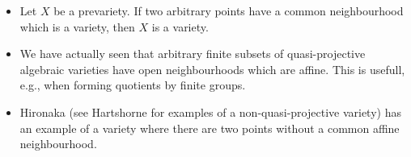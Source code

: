 \documentclass[a4paper,parskip=half,numbers=enddot, DIV=12]{scrreprt}
\begin{document}
    \begin{rem*}
        \begin{itemize}
          \item 
            Let $X$ be a prevariety. If two arbitrary points have a common neighbourhood which is a variety, then $X$ is a variety.
          \item 
            We have actually seen that arbitrary finite subsets of quasi-projective algebraic varieties have open neighbourhoods which are affine. This is usefull, e.g., when forming quotients by finite groups.
          \item
            Hironaka (see Hartshorne for examples of a non-quasi-projective variety) has an example of a variety where there are two points without a common affine neighbourhood.
        \end{itemize}
        
    \end{rem*}
\end{document}
